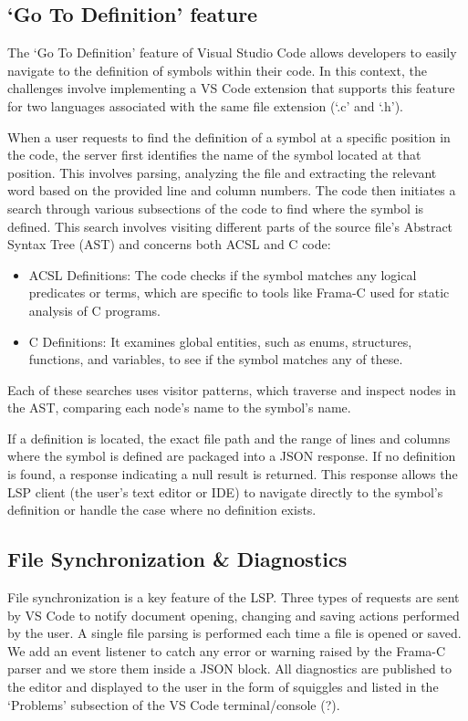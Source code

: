 \documentclass[10pt]{article}
\begin{document}
\begin{singlespace}
\subsection{`Go To Definition' feature}
The `Go To Definition' feature of Visual Studio Code allows developers to easily navigate to the definition of symbols within their code. In this context, the challenges involve implementing a VS Code extension that supports this feature for two languages associated with the same file extension (`.c' and `.h'). 

When a user requests to find the definition of a symbol at a specific position in the code, the server first identifies the name of the symbol located at that position. This involves parsing, analyzing the file and extracting the relevant word based on the provided line and column numbers.
The code then initiates a search through various subsections of the code to find where the symbol is defined. This search involves visiting different parts of the source file's Abstract Syntax Tree (AST) and concerns both ACSL and C code:
\begin{itemize}
\item ACSL Definitions: The code checks if the symbol matches any logical predicates or terms, which are specific to tools like Frama-C used for static analysis of C programs.
\item C Definitions: It examines global entities, such as enums, structures, functions, and variables, to see if the symbol matches any of these.
\end{itemize}
Each of these searches uses visitor patterns, which traverse and inspect nodes in the AST, comparing each node's name to the symbol's name.

If a definition is located, the exact file path and the range of lines and columns where the symbol is defined are packaged into a JSON response. If no definition is found, a response indicating a null result is returned. This response allows the LSP client (the user's text editor or IDE) to navigate directly to the symbol's definition or handle the case where no definition exists.

\color{magenta}

\subsection{File Synchronization \& Diagnostics}
File synchronization is a key feature of the LSP\@. Three types of requests are sent by VS Code to notify document opening, changing and saving actions performed by the user. 
A single file parsing is performed each time a file is opened or saved. We add an event listener to catch any error or warning raised by the Frama-C parser and we store them inside a JSON block.
All diagnostics are published to the editor and displayed to the user in the form of squiggles and listed in the `Problems' subsection of the VS Code terminal/console (?).


\end{singlespace}
\end{document}
